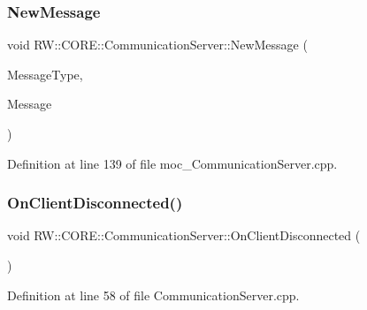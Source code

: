 \subsubsection{\texorpdfstring{New\+Message}{NewMessage}}
{\footnotesize\ttfamily void R\+W\+::\+C\+O\+R\+E\+::\+Communication\+Server\+::\+New\+Message (\begin{DoxyParamCaption}\item[{Util\+::\+Functions}]{Message\+Type,  }\item[{Q\+Byte\+Array}]{Message }\end{DoxyParamCaption})\hspace{0.3cm}{\ttfamily [signal]}}



Definition at line 139 of file moc\+\_\+\+Communication\+Server.\+cpp.

\hypertarget{class_r_w_1_1_c_o_r_e_1_1_communication_server_ae204445cecf0ff7a01409bd34a127f61}{}\label{class_r_w_1_1_c_o_r_e_1_1_communication_server_ae204445cecf0ff7a01409bd34a127f61} 
\subsubsection{\texorpdfstring{On\+Client\+Disconnected()}{OnClientDisconnected()}}
{\footnotesize\ttfamily void R\+W\+::\+C\+O\+R\+E\+::\+Communication\+Server\+::\+On\+Client\+Disconnected (\begin{DoxyParamCaption}{ }\end{DoxyParamCaption})\hspace{0.3cm}{\ttfamily [private]}}



Definition at line 58 of file Communication\+Server.\+cpp.

\hypertarget{class_r_w_1_1_c_o_r_e_1_1_communication_server_a1d852ba8f1b04e0e2e49b369c0f1d32d}{}\label{class_r_w_1_1_c_o_r_e_1_1_communication_server_a1d852ba8f1b04e0e2e49b369c0f1d32d} 
